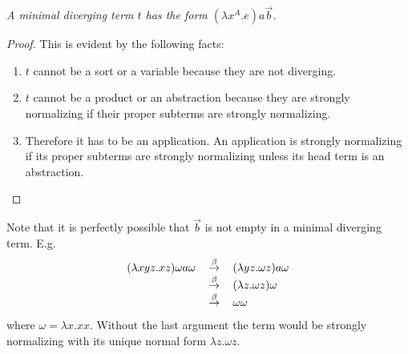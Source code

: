 \begin{theorem}
    \label{thm:FormMinimalDiverging}
    \emph{A minimal diverging term $t$ has the form $(\lambda x^A.e) a \vec b$.}

    \begin{proof}
        This is evident by the following facts:
        \begin{enumerate}
        \item $t$ cannot be a sort or a variable because they are not diverging.

        \item $t$ cannot be a product or an abstraction because they are
            strongly normalizing if their proper subterms are strongly
            normalizing.

        \item Therefore it has to be an application. An application is strongly
            normalizing if its proper subterms are strongly normalizing unless
            its head term is an abstraction.
        \end{enumerate}
    \end{proof}
\end{theorem}

Note that it is perfectly possible that $\vec b$ is not empty in a minimal
diverging term. E.g.
$$
\begin{array}{lll}
    (\lambda x y z. x z) \omega a \omega
    &{\,\stackrel{\beta}{\to}\,}&
    (\lambda y z. \omega z) a \omega
    \\
    &{\,\stackrel{\beta}{\to}\,}&
    (\lambda z. \omega z) \omega
    \\
    &{\,\stackrel{\beta}{\to}\,}&
    \omega \omega
\end{array}
$$
where $\omega = \lambda x. x x$. Without the last argument the term would be
strongly normalizing with its unique normal form $\lambda z. \omega z$.




